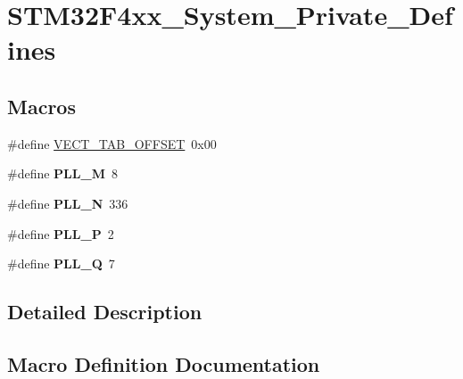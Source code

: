 \hypertarget{group___s_t_m32_f4xx___system___private___defines}{}\section{S\+T\+M32\+F4xx\+\_\+\+System\+\_\+\+Private\+\_\+\+Defines}
\label{group___s_t_m32_f4xx___system___private___defines}
\subsection*{Macros}
\begin{DoxyCompactItemize}
\item 
\#define \hyperlink{group___s_t_m32_f4xx___system___private___defines_ga40e1495541cbb4acbe3f1819bd87a9fe}{V\+E\+C\+T\+\_\+\+T\+A\+B\+\_\+\+O\+F\+F\+S\+E\+T}~0x00
\item 
\hypertarget{group___s_t_m32_f4xx___system___private___defines_ga0fa5a868f5cd056a04b1c42e454b9617}{}\#define {\bfseries P\+L\+L\+\_\+\+M}~8\label{group___s_t_m32_f4xx___system___private___defines_ga0fa5a868f5cd056a04b1c42e454b9617}

\item 
\hypertarget{group___s_t_m32_f4xx___system___private___defines_ga04586ea638d21afe558db4f2798c38a6}{}\#define {\bfseries P\+L\+L\+\_\+\+N}~336\label{group___s_t_m32_f4xx___system___private___defines_ga04586ea638d21afe558db4f2798c38a6}

\item 
\hypertarget{group___s_t_m32_f4xx___system___private___defines_ga290dcd27167e925d817e8334111c1c01}{}\#define {\bfseries P\+L\+L\+\_\+\+P}~2\label{group___s_t_m32_f4xx___system___private___defines_ga290dcd27167e925d817e8334111c1c01}

\item 
\hypertarget{group___s_t_m32_f4xx___system___private___defines_gac958257ddb2537c539cffdb3a4543067}{}\#define {\bfseries P\+L\+L\+\_\+\+Q}~7\label{group___s_t_m32_f4xx___system___private___defines_gac958257ddb2537c539cffdb3a4543067}

\end{DoxyCompactItemize}


\subsection{Detailed Description}


\subsection{Macro Definition Documentation}
\hypertarget{group___s_t_m32_f4xx___system___private___defines_ga40e1495541cbb4acbe3f1819bd87a9fe}{}
